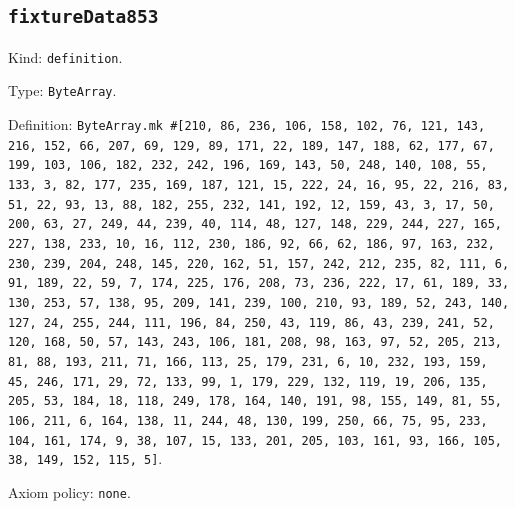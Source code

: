 \documentclass[11pt]{article}
\begin{document}
\subsection*{\texttt{fixtureData853}}
\noindent Kind: \texttt{definition}.\par
\noindent Type: \texttt{ByteArray}.\par
\noindent Definition: \texttt{ByteArray.mk \#[210, 86, 236, 106, 158, 102, 76, 121, 143, 216, 152, 66, 207, 69, 129, 89, 171, 22, 189, 147, 188, 62, 177, 67, 199, 103, 106, 182, 232, 242, 196, 169, 143, 50, 248, 140, 108, 55, 133, 3, 82, 177, 235, 169, 187, 121, 15, 222, 24, 16, 95, 22, 216, 83, 51, 22, 93, 13, 88, 182, 255, 232, 141, 192, 12, 159, 43, 3, 17, 50, 200, 63, 27, 249, 44, 239, 40, 114, 48, 127, 148, 229, 244, 227, 165, 227, 138, 233, 10, 16, 112, 230, 186, 92, 66, 62, 186, 97, 163, 232, 230, 239, 204, 248, 145, 220, 162, 51, 157, 242, 212, 235, 82, 111, 6, 91, 189, 22, 59, 7, 174, 225, 176, 208, 73, 236, 222, 17, 61, 189, 33, 130, 253, 57, 138, 95, 209, 141, 239, 100, 210, 93, 189, 52, 243, 140, 127, 24, 255, 244, 111, 196, 84, 250, 43, 119, 86, 43, 239, 241, 52, 120, 168, 50, 57, 143, 243, 106, 181, 208, 98, 163, 97, 52, 205, 213, 81, 88, 193, 211, 71, 166, 113, 25, 179, 231, 6, 10, 232, 193, 159, 45, 246, 171, 29, 72, 133, 99, 1, 179, 229, 132, 119, 19, 206, 135, 205, 53, 184, 18, 118, 249, 178, 164, 140, 191, 98, 155, 149, 81, 55, 106, 211, 6, 164, 138, 11, 244, 48, 130, 199, 250, 66, 75, 95, 233, 104, 161, 174, 9, 38, 107, 15, 133, 201, 205, 103, 161, 93, 166, 105, 38, 149, 152, 115, 5]}.\par
\noindent Axiom policy: \texttt{none}.\par
\end{document}
